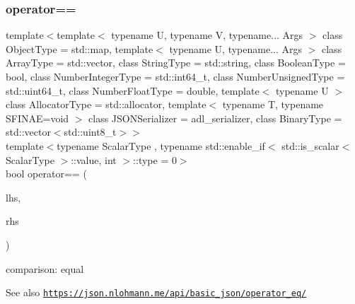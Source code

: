 \subsubsection{\texorpdfstring{operator==}{operator==}\hspace{0.1cm}{\footnotesize\ttfamily [2/3]}}
{\footnotesize\ttfamily template$<$template$<$ typename U, typename V, typename... Args $>$ class Object\+Type = std\+::map, template$<$ typename U, typename... Args $>$ class Array\+Type = std\+::vector, class String\+Type  = std\+::string, class Boolean\+Type  = bool, class Number\+Integer\+Type  = std\+::int64\+\_\+t, class Number\+Unsigned\+Type  = std\+::uint64\+\_\+t, class Number\+Float\+Type  = double, template$<$ typename U $>$ class Allocator\+Type = std\+::allocator, template$<$ typename T, typename S\+F\+I\+N\+A\+E=void $>$ class J\+S\+O\+N\+Serializer = adl\+\_\+serializer, class Binary\+Type  = std\+::vector$<$std\+::uint8\+\_\+t$>$$>$ \\
template$<$typename Scalar\+Type , typename std\+::enable\+\_\+if$<$ std\+::is\+\_\+scalar$<$ Scalar\+Type $>$\+::value, int $>$\+::type  = 0$>$ \\
bool operator== (\begin{DoxyParamCaption}\item[{\hyperlink{classnlohmann_1_1basic__json_ab8a1c33ee7b154fc41ca2545aa9724e6}{const\+\_\+reference}}]{lhs,  }\item[{Scalar\+Type}]{rhs }\end{DoxyParamCaption})\hspace{0.3cm}{\ttfamily [friend]}}



comparison\+: equal 

\begin{DoxySeeAlso}{See also}
\href{https://json.nlohmann.me/api/basic_json/operator_eq/}{\tt https\+://json.\+nlohmann.\+me/api/basic\+\_\+json/operator\+\_\+eq/} 
\end{DoxySeeAlso}
\mbox{\label{classnlohmann_1_1basic__json_a24ae7acd5b06ae49cfe1c94633436b68}} 
